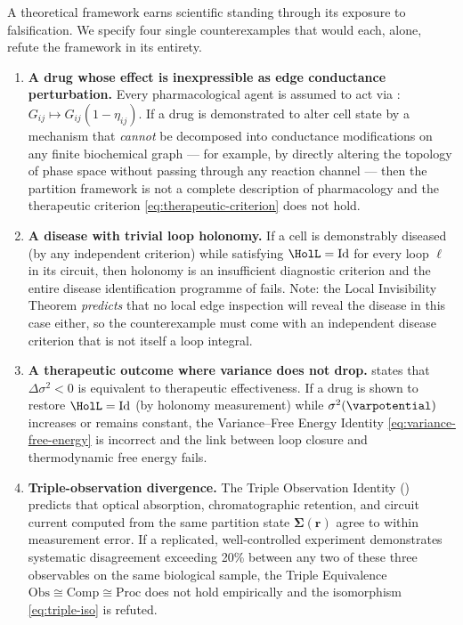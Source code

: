 A theoretical framework earns scientific standing through its exposure to
falsification.  We specify four single counterexamples that would each, alone,
refute the framework in its entirety.

\begin{enumerate}[label=\textbf{F\arabic*.}, leftmargin=3em]

\item \textbf{A drug whose effect is inexpressible as edge conductance perturbation.}
  Every pharmacological agent is assumed to act via :
  $G_{ij} \mapsto G_{ij}(1-\eta_{ij})$.  If a drug is demonstrated to alter
  cell state by a mechanism that \emph{cannot} be decomposed into conductance
  modifications on any finite biochemical graph — for example, by directly
  altering the topology of phase space without passing through any reaction
  channel — then the partition framework is not a complete description of
  pharmacology and the therapeutic criterion \eqref{eq:therapeutic-criterion}
  does not hold.

\item \textbf{A disease with trivial loop holonomy.}
  If a cell is demonstrably diseased (by any independent criterion) while
  satisfying $\HolL = \mathrm{Id}$ for every loop $\ell$ in its circuit, then
  holonomy is an insufficient diagnostic criterion and the entire disease
  identification programme of  fails.
  Note: the Local Invisibility Theorem \emph{predicts} that no local edge
  inspection will reveal the disease in this case either, so the counterexample
  must come with an independent disease criterion that is not itself a loop
  integral.

\item \textbf{A therapeutic outcome where variance does not drop.}
   states that $\Delta\sigma^2 < 0$ is equivalent
  to therapeutic effectiveness.  If a drug is shown to restore $\HolL = \mathrm{Id}$
  (by holonomy measurement) while $\sigma^2(\varpotential)$ increases or remains
  constant, the Variance--Free Energy Identity \eqref{eq:variance-free-energy}
  is incorrect and the link between loop closure and thermodynamic free energy
  fails.

\item \textbf{Triple-observation divergence.}
  The Triple Observation Identity () predicts that
  optical absorption, chromatographic retention, and circuit current computed
  from the same partition state $\boldsymbol{\Sigma}(\mathbf{r})$ agree to
  within measurement error.  If a replicated, well-controlled experiment
  demonstrates systematic disagreement exceeding 20\% between any two of these
  three observables on the same biological sample, the Triple Equivalence
  $\mathrm{Obs} \cong \mathrm{Comp} \cong \mathrm{Proc}$ does not hold
  empirically and the isomorphism \eqref{eq:triple-iso} is refuted.

\end{enumerate}

